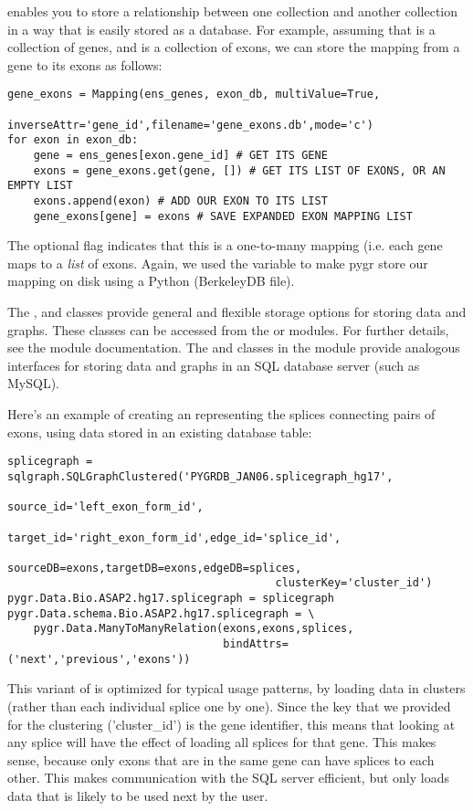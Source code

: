 \documentclass{howto}
\begin{document}
 enables you to store a relationship between one collection
and another collection in a way that is easily stored as a database.  For
example, assuming that  is a collection of genes,
and  is a collection of exons, we can store the mapping from
a gene to its exons as follows:

\begin{verbatim}
gene_exons = Mapping(ens_genes, exon_db, multiValue=True, 
                     inverseAttr='gene_id',filename='gene_exons.db',mode='c')
for exon in exon_db:
    gene = ens_genes[exon.gene_id] # GET ITS GENE
    exons = gene_exons.get(gene, []) # GET ITS LIST OF EXONS, OR AN EMPTY LIST
    exons.append(exon) # ADD OUR EXON TO ITS LIST
    gene_exons[gene] = exons # SAVE EXPANDED EXON MAPPING LIST
\end{verbatim}
The optional  flag indicates that this is a one-to-many
mapping (i.e. each gene maps to a {\em list} of exons.  Again, we used the 
 variable to make pygr store our mapping on disk using a Python
 (BerkeleyDB file).

The ,  and  classes provide
general and flexible storage options for storing data and graphs.  These classes
can be accessed from the  or  modules.
For further details, see the  module documentation.
The  and  classes in the 
module provide analogous interfaces for storing data and graphs in an SQL
database server (such as MySQL).

Here's an example of creating an  representing
the splices connecting pairs of exons, using data stored in an
existing database table:
\begin{verbatim}
splicegraph = sqlgraph.SQLGraphClustered('PYGRDB_JAN06.splicegraph_hg17',
                                         source_id='left_exon_form_id',
                                         target_id='right_exon_form_id',edge_id='splice_id',
                                         sourceDB=exons,targetDB=exons,edgeDB=splices,
                                         clusterKey='cluster_id')
pygr.Data.Bio.ASAP2.hg17.splicegraph = splicegraph
pygr.Data.schema.Bio.ASAP2.hg17.splicegraph = \
    pygr.Data.ManyToManyRelation(exons,exons,splices,
                                 bindAttrs=('next','previous','exons'))
\end{verbatim}
This variant of  is optimized for typical usage patterns,
by loading data in clusters (rather than each individual splice one by one).
Since the key that we provided for the clustering ('cluster_id') is the 
gene identifier, this means that looking at any splice will have the effect
of loading all splices for that gene.  This makes sense, because only exons
that are in the same gene can have splices to each other.  This makes
communication with the SQL server efficient, but only loads data that
is likely to be used next by the user.
\end{document}

